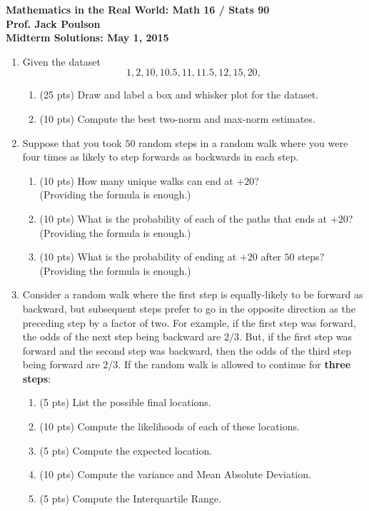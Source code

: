 \documentclass[11pt]{article}
\begin{document}
\noindent
{\bf Mathematics in the Real World: Math 16 / Stats 90}\\
{\bf Prof. Jack Poulson}\\
{\bf Midterm Solutions: May 1, 2015}\\

\begin{enumerate}

\item
  Given the dataset 
  \[
    1, 2, 10, 10.5, 11, 11.5, 12, 15, 20,
  \]
  \begin{enumerate}
  \item
   (25 pts) Draw and label a box and whisker plot for the dataset.
  \item 
   (10 pts) Compute the best two-norm and max-norm estimates.
  \end{enumerate}

\item 
  Suppose that you took $50$ random steps in a random walk where you were four 
  times as likely to step forwards as backwards in each step.
  \begin{enumerate}
  \item
    (10 pts) How many unique walks can end at $+20$? \\
    (Providing the formula is enough.)
  \item
    (10 pts) What is the probability of each of the paths that ends at $+20$? \\
    (Providing the formula is enough.)
  \item
    (10 pts) What is the probability of ending at $+20$ after $50$ steps? \\
    (Providing the formula is enough.)
  \end{enumerate}

\item
  Consider a random walk where the first step is equally-likely to be forward 
  as backward, but subsequent steps prefer to go in the opposite direction as 
  the preceding step by a factor of two.
  For example, if the first step was forward, the odds of the next step being
  backward are $2/3$. But, if the first step was forward and the second step 
  was backward, then the odds of the third step being forward are $2/3$.
  If the random walk is allowed to continue for {\bf three steps}:
  \begin{enumerate}
  \item (5 pts) List the possible final locations.
  \item (10 pts) Compute the likelihoods of each of these locations.
  \item (5 pts) Compute the expected location.
  \item (10 pts) Compute the variance and Mean Absolute Deviation.
  \item (5 pts) Compute the Interquartile Range.
  \end{enumerate}
\end{enumerate}
\end{document}
